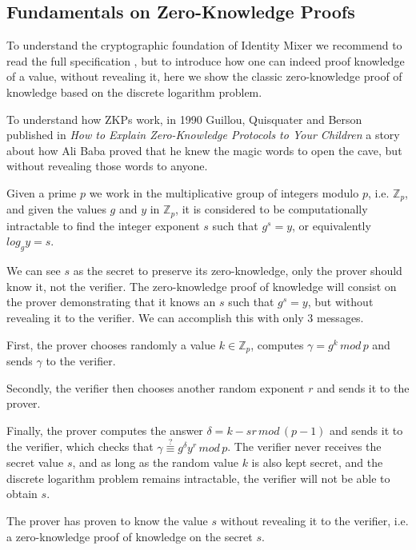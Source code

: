 \documentclass[journal]{IEEEtran}
\begin{document}

\subsection{Fundamentals on Zero-Knowledge Proofs}


To understand the cryptographic foundation of Identity Mixer we recommend to read the full specification \cite{idemixSpec}, but to introduce how one can indeed proof knowledge of a value, without revealing it, here we show the classic zero-knowledge proof of knowledge based on the discrete logarithm problem.

To understand how ZKPs work, in 1990 Guillou, Quisquater and Berson published in \textit{How to Explain Zero-Knowledge Protocols to Your Children} \cite{ZKPcave:story} a story about how Ali Baba proved that he knew the magic words to open the cave, but without revealing those words to anyone.

Given a prime $p$ we work in the multiplicative group of integers modulo $p$, i.e. $\mathbb{Z}_p$, and given the values $g$ and $y$ in $\mathbb{Z}_p$, it is considered to be computationally intractable to find the integer exponent $s$ such that $g^s = y$, or equivalently $log_g y = s$.

We can see $s$ as the secret to preserve its zero-knowledge, only the prover should know it, not the verifier. The zero-knowledge proof of knowledge will consist on the prover demonstrating that it knows an $s$ such that $g^s = y$, but without revealing it to the verifier. We can accomplish this with only 3 messages.

First, the prover chooses randomly a value $k \in \mathbb{Z}_p$, computes $\gamma = g^k\, mod\, p$ and sends $\gamma$ to the verifier.

Secondly, the verifier then chooses another random exponent $r$ and sends it to the prover.

Finally, the prover computes the answer $\delta=k-sr \, mod\, (p-1)$ and sends it to the verifier, which checks that $\gamma \overset{?}{\equiv} g^{\delta} y^r \, mod \, p$. The verifier never receives the secret value $s$, and as long as the random value $k$ is also kept secret, and the discrete logarithm problem remains intractable, the verifier will not be able to obtain $s$.

The prover has proven to know the value $s$ without revealing it to the verifier, i.e. a zero-knowledge proof of knowledge on the secret $s$.
\end{document}
